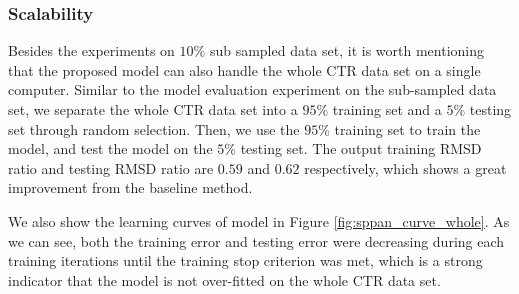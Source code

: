 \subsubsection{Scalability}

Besides the experiments on $10\%$ sub sampled data set, it is worth
mentioning that the proposed {\sppan} model can also handle the whole
CTR data set on a single computer. Similar to the model evaluation
experiment on the sub-sampled data set, we separate the whole CTR data
set into a $95\%$ training set and a $5\%$ testing set through random
selection. Then, we use the $95\%$ training set to train the {\sppan}
model, and test the model on the $5\%$ testing set. The output
training RMSD ratio and testing RMSD ratio are $0.59$ and $0.62$
respectively, which shows a great improvement from the baseline
method.

We also show the learning curves of {\sppan} model in Figure
\ref{fig:sppan_curve_whole}. As we can see, both the training error
and testing error were decreasing during each training iterations
until the training stop criterion was met, which is a strong indicator
that the {\sppan} model is not over-fitted on the whole CTR data set.
